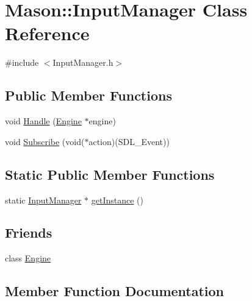 \hypertarget{class_mason_1_1_input_manager}{}\section{Mason\+:\+:Input\+Manager Class Reference}
\label{class_mason_1_1_input_manager}


{\ttfamily \#include $<$Input\+Manager.\+h$>$}

\subsection*{Public Member Functions}
\begin{DoxyCompactItemize}
\item 
void \hyperlink{class_mason_1_1_input_manager_a471142ccebfdb1574c342fa6a831f244}{Handle} (\hyperlink{class_mason_1_1_engine}{Engine} $\ast$engine)
\item 
void \hyperlink{class_mason_1_1_input_manager_a14e32a051270da528c2c88674d8b5d22}{Subscribe} (void($\ast$action)(S\+D\+L\+\_\+\+Event))
\end{DoxyCompactItemize}
\subsection*{Static Public Member Functions}
\begin{DoxyCompactItemize}
\item 
static \hyperlink{class_mason_1_1_input_manager}{Input\+Manager} $\ast$ \hyperlink{class_mason_1_1_input_manager_a4d4852e7a0451fe53d9c116d8c3100d8}{get\+Instance} ()
\end{DoxyCompactItemize}
\subsection*{Friends}
\begin{DoxyCompactItemize}
\item 
class \hyperlink{class_mason_1_1_input_manager_a3e1914489e4bed4f9f23cdeab34a43dc}{Engine}
\end{DoxyCompactItemize}


\subsection{Member Function Documentation}
\hypertarget{class_mason_1_1_input_manager_a4d4852e7a0451fe53d9c116d8c3100d8}{}\label{class_mason_1_1_input_manager_a4d4852e7a0451fe53d9c116d8c3100d8} 
